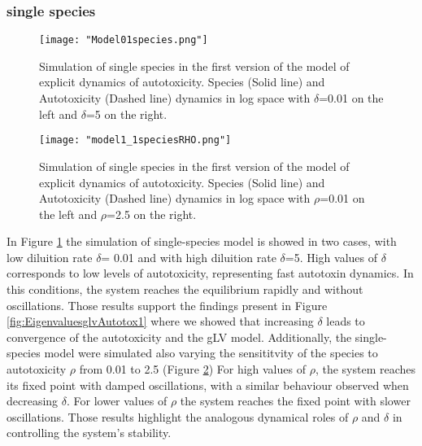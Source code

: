 \documentclass[11pt,a4paper,fleqn]{article}
\begin{document}
\subsubsection{single species}
\begin{figure}[h]
    \centering
    \texttt{[image: "Model01species.png"]} %
    \caption{\label{Model01species} Simulation of single species in the first version of the model of explicit dynamics of autotoxicity.
    Species (Solid line) and Autotoxicity (Dashed line) dynamics in log space with $\delta$=0.01 on the left and $\delta$=5 on the right.}
\end{figure}

\begin{figure}[h]
    \centering
    \texttt{[image: "model1\_1speciesRHO.png"]} %
    \caption{\label{model1_1speciesRHO} Simulation of single species in the first version of the model of explicit dynamics of autotoxicity.
    Species (Solid line) and Autotoxicity (Dashed line) dynamics in log space with $\rho$=0.01 on the left and $\rho$=2.5 on the right.}
    
\end{figure}

In Figure \ref{Model01species} the simulation of single-species model is showed in two cases, with low diluition rate $\delta$= 0.01 and with high diluition rate $\delta$=5. 
 High values of $\delta$ corresponds to low levels of autotoxicity, representing fast autotoxin dynamics. 
 In this conditions, the system reaches the equilibrium rapidly and without oscillations.
Those results support the findings present in Figure \ref{fig:EigenvaluesglvAutotox1} where we showed that
increasing $\delta$ leads to convergence of the autotoxicity and the gLV model.
Additionally, the single-species model were simulated also varying the sensititvity of the species to autotoxicity $\rho$ from 0.01 to 2.5 (Figure \ref{model1_1speciesRHO})
For high values of  $\rho$, the system reaches its fixed point with damped oscillations, with a similar behaviour
observed when decreasing $\delta$. For lower values of $\rho$ the system reaches
the fixed point with slower oscillations. Those results highlight the analogous dynamical
roles of $\rho$ and $\delta$ in controlling the system's stability.
\end{document}
